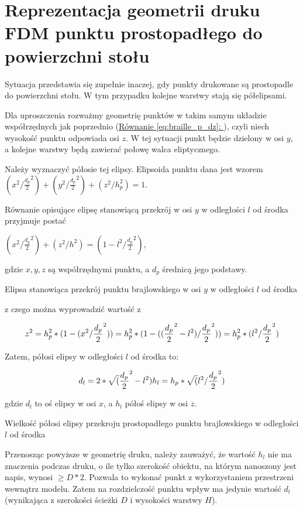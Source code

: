 \documentclass[12pt,a4paper]{article}
\newcommand*{\feqref}[1]{(\hyperref[{#1}]{Równanie \ref{#1}: \nameref*{#1}})}
\begin{document}
\section{Reprezentacja geometrii druku FDM punktu prostopadłego do powierzchni stołu}
Sytuacja przedstawia się zupełnie inaczej, gdy punkty drukowane są prostopadle do powierzchni stołu. W tym przypadku kolejne warstwy stają się półelipsami.

Dla uproszczenia rozważmy geometrię punktów w takim samym układzie współrzędnych jak poprzednio \feqref{eq:braille_p_dz}, czyli niech wysokość punktu odpowiada osi $z$. W tej sytuacji punkt będzie dzielony w osi $y$, a kolejne warstwy będą zawierać połowę walca eliptycznego.

Należy wyznaczyć półosie tej elipsy.
Elipsoida punktu dana jest wzorem
$(x^2 / \frac{d_p}{2}^2) + (y^2 / \frac{d_p}{2}^2) + (z^2 / h_p^2) = 1$.

Równanie opisujące elipsę stanowiącą przekrój w osi $y$ w odległości $l$ od środka przyjmuje postać

\begin{feq}
$(x^2 / \frac{d_p}{2}^2) + (z^2 / h^2) = (1 - l^2 / \frac{d_p}{2}^2),$

gdzie $x, y, z$ są współrzędnymi punktu, a $d_p$ średnicą jego podstawy.
\caption{Elipsa stanowiąca przekrój punktu brajlowskiego w osi $y$ w odległości $l$ od środka}
\end{feq}

z czego można wyprowadzić wartość z

$$
z^2 = h_p^2 * (1 - (x^2 / \frac{d_p}{2}^2)) = \\
h_p^2 * (1 - ((\frac{d_p}{2}^2 - l^2) / \frac{d_p}{2}^2)) = \\
h_p^2 * (l^2 / \frac{d_p}{2}^2)
$$

Zatem, półosi elipsy w odległości $l$ od środka to:

\begin{feq}
$$
d_l = 2 * \sqrt(\frac{d_p}{2}^2 - l^2) \\
h_l = h_p * \sqrt(l^2 / \frac{d_p}{2}^2)
$$

gdzie $d_l$ to oś elipsy w osi $x$, a $h_l$ półoś elipsy w osi $z$.
\caption{Wielkość półosi elipsy przekroju prostopadłego punktu brajlowskiego w odległości $l$ od środka}
\end{feq}

Przenosząc powyższe w geometrię druku, należy zauważyć, że wartość $h_l$ nie ma znaczenia podczas druku, o ile tylko szerokość obiektu, na którym nanoszony jest napis, wynosi $\geq D*2$. Pozwala to wykonać punkt z wykorzystaniem przestrzeni wewnątrz modelu.
Zatem na rozdzielczość punktu wpływ ma jedynie wartość $d_l$ (wynikająca z szerokości ścieżki $D$ i wysokości warstwy $H$).
\end{document}
